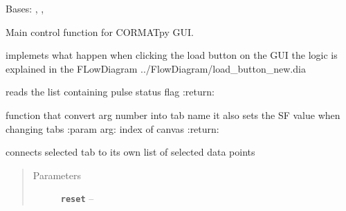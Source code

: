 \documentclass[letterpaper,10pt,english]{sphinxmanual}
\begin{document}
\begin{fulllineitems}
\label{Cormat_main:Cormat_main.CORMAT_GUI}
Bases: , {\hyperref[CORMAT_GUI:CORMAT_GUI.Ui_CORMAT_py]{}}, {\hyperref[custom_formatters:custom_formatters.QPlainTextEditLogger]{}}

Main control function for CORMATpy GUI.

\begin{fulllineitems}
\label{Cormat_main:Cormat_main.CORMAT_GUI.handle_readbutton_master}
implemets what happen when clicking the load button on the GUI
the logic is explained in the FLowDiagram ../FlowDiagram/load\_button\_new.dia

\end{fulllineitems}


\begin{fulllineitems}
\label{Cormat_main:Cormat_main.CORMAT_GUI.checkStatuFlags}
reads the list containing pulse status flag
:return:

\end{fulllineitems}


\begin{fulllineitems}
\label{Cormat_main:Cormat_main.CORMAT_GUI.canvasselected}
function that convert arg number into tab name
it also sets the SF value when changing tabs
:param arg: index of canvas
:return:

\end{fulllineitems}


\begin{fulllineitems}
\label{Cormat_main:Cormat_main.CORMAT_GUI.setcoord}
connects selected tab to its own list of selected data points
\begin{quote}\begin{description}
\item[{Parameters}] \leavevmode
\textbf{\texttt{reset}} -- 


\end{description}
\end{quote}
\end{fulllineitems}
\end{fulllineitems}
\end{document}

